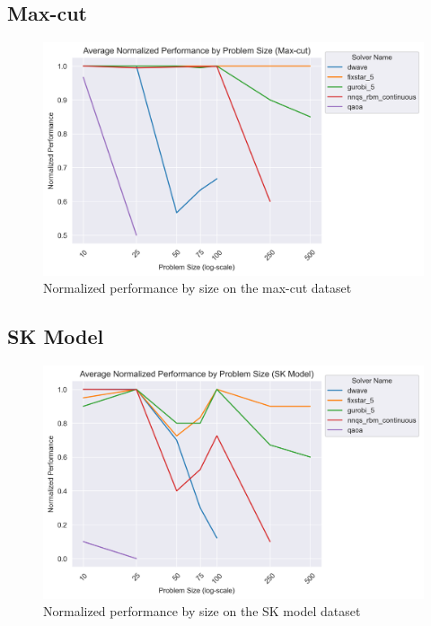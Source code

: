 \subsection{Max-cut}
\begin{figure}[!h]
    \centering
    \includegraphics[width=1\linewidth]{images/maxcut_normalized_performance_all.png}
    \caption{Normalized performance by size on the max-cut dataset}
    \label{all-maxcut-size}
\end{figure}

\subsection{SK Model}
\begin{figure}[!h]
    \centering
    \includegraphics[width=1\linewidth]{images/skmodel_normalized_performance_all.png}
    \caption{Normalized performance by size on the SK model dataset}
    \label{all-skmodel-size}
\end{figure}